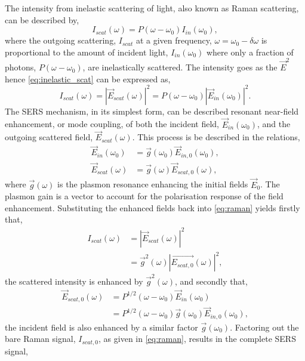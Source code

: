 \documentclass{article}
\begin{document}
The intensity from inelastic scattering of light, also known as Raman scattering, can be described by,
\begin{equation}
I_{scat}(\omega) = P(\omega - \omega_0) I_{in}(\omega_0),
\label{eq:inelastic_scat}
\end{equation}
where the outgoing scattering, $I_{scat}$ at a given frequency, $\omega = \omega_0 - \delta\omega$ is proportional to the amount of incident light, $I_{in}(\omega_0)$ where only a fraction of photons, $P(\omega - \omega_0)$, are inelastically scattered. The intensity goes as the $\vec{E}^2$ hence \eqref{eq:inelastic_scat} can be expressed as,
\begin{equation}
I_{scat}(\omega) = \left| \vec{E}_{scat}(\omega) \right|^2 = P(\omega - \omega_0) \left|\vec{E}_{in}(\omega_0)\right|^2.
\label{eq:raman}
\end{equation}
The SERS mechanism, in its simplest form, can be described resonant near-field enhancement, or mode coupling, of both the incident field, $\vec{E}_{in}(\omega_0)$, and the outgoing scattered field, $\vec{E}_{scat}(\omega)$. This process is be described in the relations,
\begin{subequations}
\begin{align}
\vec{E}_{in}(\omega_0) &= \vec{g}(\omega_0) \vec{E}_{in, 0}(\omega_0),\\
\vec{E}_{scat}(\omega) &= \vec{g}(\omega) \vec{E}_{scat, 0}(\omega),
\end{align}
\end{subequations}
where $\vec{g}(\omega)$ is the plasmon resonance enhancing the initial fields $\vec{E}_0$. The plasmon gain is a vector to account for the polarisation response of the field enhancement. Substituting the enhanced fields back into \eqref{eq:raman} yields firstly that,
\begin{align}
I_{scat}(\omega) &= \left| \vec{E}_{scat}(\omega) \right|^2 \\
			  &= \vec{g}^2(\omega) \left| \vec{E_{scat, 0}}(\omega) \right|^2,
\end{align}
the scattered intensity is enhanced by $\vec{g}^2(\omega)$, and secondly that,
\begin{align}
\vec{E}_{scat, 0}(\omega) &= P^{1/2}(\omega - \omega_0) \vec{E}_{in}(\omega_0) \\
					&= P^{1/2}(\omega - \omega_0) \vec{g}(\omega_0) \vec{E}_{in, 0}(\omega_0),
\end{align}
the incident field is also enhanced by a similar factor $\vec{g}(\omega_0)$. Factoring out the bare Raman signal, $I_{scat,0}$, as given in \eqref{eq:raman}, results in the complete SERS signal,
\end{document}
